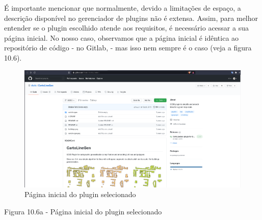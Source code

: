 \documentclass[
]{krantz}
\begin{document}
É importante mencionar que normalmente, devido a limitações de espaço, a descrição disponível no gerenciador de plugins não é extensa. Assim, para melhor entender se o plugin escolhido atende aos requisitos, é necessário acessar a sua página inicial. No nosso caso, observamos que a página inicial é idêntica ao repositório de código - no Gitlab, - mas isso nem sempre é o caso (veja a figura 10.6).

\begin{figure}
\centering
\includegraphics{media/modulo10/fig106_a.png}
\caption{Página inicial do plugin selecionado}
\end{figure}

Figura 10.6a - Página inicial do plugin selecionado
\end{document}
